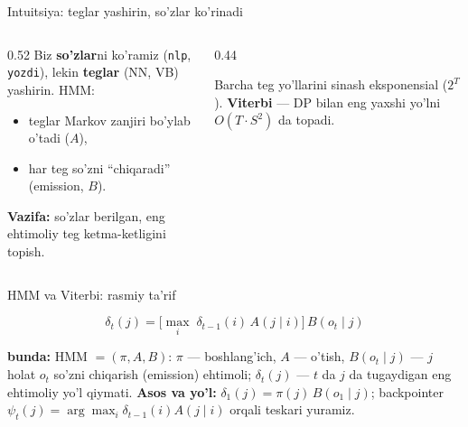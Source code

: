 \documentclass[aspectratio=169,11pt]{beamer}
\newcommand{\bunda}[1]{{\small\textbf{bunda:}\; #1}}
\begin{document}
\begin{frame}{Intuitsiya: teglar yashirin, so'zlar ko'rinadi}
  \begin{columns}[T]
    \begin{column}{0.52\textwidth}
      \small
      Biz \textbf{so'zlar}ni ko'ramiz (\texttt{nlp}, \texttt{yozdi}), lekin
      \textbf{teglar} (NN, VB) yashirin. HMM:
      \begin{itemize}\setlength\itemsep{1pt}
        \item teglar Markov zanjiri bo'ylab o'tadi ($A$),
        \item har teg so'zni ``chiqaradi'' (emission, $B$).
      \end{itemize}
      \vspace{4pt}
      \textbf{Vazifa:} so'zlar berilgan, eng ehtimoliy teg ketma-ketligini topish.
    \end{column}
    \begin{column}{0.44\textwidth}
      \begin{tcolorbox}[okbox,top=2pt,bottom=2pt]
        \footnotesize
        Barcha teg yo'llarini sinash eksponensial ($2^T$). \textbf{Viterbi}
        --- DP bilan eng yaxshi yo'lni $O(T\cdot S^2)$ da topadi.
      \end{tcolorbox}
    \end{column}
  \end{columns}
\end{frame}

\begin{frame}{HMM va Viterbi: rasmiy ta'rif}
  \begin{tcolorbox}[defbox,title=Ta'rif: HMM uchligi va Viterbi rekurrensiyasi]
    \vspace{-0.4em}
    $$ \delta_t(j) = \Big[\max_{i} \; \delta_{t-1}(i)\, A(j\mid i)\Big]\, B(o_t \mid j) $$
  \end{tcolorbox}
  \vspace{2pt}
  \bunda{HMM $=(\pi, A, B)$: $\pi$ --- boshlang'ich, $A$ --- o'tish,
  $B(o_t\mid j)$ --- $j$ holat $o_t$ so'zni chiqarish (emission) ehtimoli;
  $\delta_t(j)$ --- $t$ da $j$ da tugaydigan eng ehtimoliy yo'l qiymati.}
  \vspace{4pt}
  \textbf{Asos va yo'l:} $\delta_1(j)=\pi(j)\,B(o_1\mid j)$; \;
  backpointer $\psi_t(j)=\arg\max_i \delta_{t-1}(i)A(j\mid i)$ orqali teskari yuramiz.
\end{frame}
\end{document}
